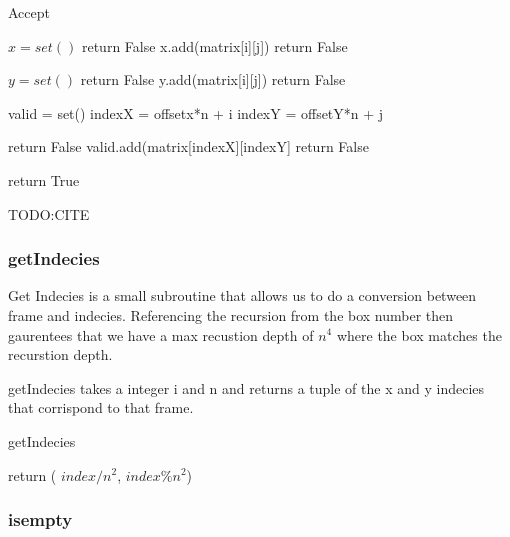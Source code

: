 \documentclass{sig-alternate}
\begin{document}
\begin{algorithm}[H]
\caption{Accept}\label{accept}
\begin{algorithmic}[1]

\State $x = set()$
\State return False
\EndIf
\State x.add(matrix[i][j])
\Else
\State return False
\EndIf
\EndFor
\EndFor

\State $y = set()$
\State return False
\EndIf
\State y.add(matrix[i][j])
\Else
\State return False
\EndIf
\EndFor
\EndFor

\State valid = set()
\State indexX = offsetx*n + i
\State indexY = offsetY*n + j

\State return False
\EndIf
\State valid.add(matrix[indexX][indexY]
\Else
\State return False
\EndIf
    
\EndFor
\EndFor
\EndFor
\EndFor
\State return True
\EndProcedure
\end{algorithmic}
\end{algorithm}
TODO:CITE

\subsubsection{getIndecies}
Get Indecies is a small subroutine that allows us to do a conversion between frame and indecies. Referencing the
recursion from the box number then gaurentees that we have a max recustion depth of $n^4$ where the box matches the recurstion depth. 

getIndecies takes a integer i and n and returns a tuple of the x and y indecies that corrispond to that frame.

\begin{algorithm}[H]
\caption{getIndecies}\label{getIndecies}
\begin{algorithmic}[1]

\State return ( $index / n^2$, $index \% n^2$)

\EndProcedure
\end{algorithmic}
\end{algorithm}


\subsubsection{isempty}
\end{document}
